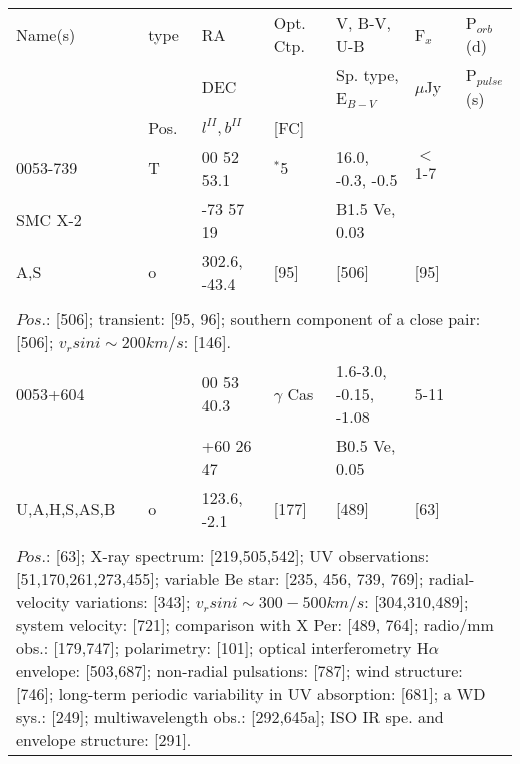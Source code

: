 \documentclass{aa}
\begin{document}
\clearpage\begin{table*}[h]
\begin{tabular}{p{2.5cm}p{1cm}p{1.8cm}p{2.3cm}p{3.3cm}p{2.0cm}p{2.2cm}}
\noalign{\smallskip}
\multicolumn{7}{p{17.5cm}}{Table 1.  (continued) }\\        
\hline
\noalign{\smallskip}
Name(s)      & type  & RA                       &  Opt. Ctp. & V, B-V, U-B                    &   F$_{x}$           & P$_{orb}$(d)    \\
                      &            &  DEC                   &                     &  Sp. type, E$_{B-V}$  &    $\mu$Jy        & P$_{pulse}$(s) \\
                      & Pos.  &  $l^{II}, b^{II}$     &  [FC]           &                                          &                            &                             \\
\noalign{\smallskip} 

\hline
\noalign{\smallskip}
0053-739     &   T      & 00 52 53.1           & $^*$5         & 16.0, -0.3, -0.5                 &    $<$ 1-7          &                              \\
SMC X-2     &            & -73 57 19             &                    & B1.5 Ve, 0.03                  &                            &                              \\
A,S               &  o       & 302.6, -43.4         &  [95]         &    [506]                              &        [95]          &                              \\
\\
\multicolumn{7}{p{17.5cm}}{
$Pos$.: [506]; transient: [95, 96]; southern component of a close pair: [506]; $v_rsin i \sim  200 km/s$: [146].}\\

\noalign{\smallskip}
\hline
\noalign{\smallskip}
0053+604     &            & 00 53 40.3            & $\gamma$ Cas   & 1.6-3.0, -0.15, -1.08   &    5-11        &                   \\
                       &            & +60 26 47             &                                 & B0.5 Ve, 0.05             &                    &                   \\
U,A,H,S,AS,B  &  o       & 123.6, -2.1             &  [177]                      &    [489]                         &   [63]          &                   \\
\\
\multicolumn{7}{p{17.5cm}}{
$Pos$.: [63]; X-ray spectrum: [219,505,542]; UV observations: [51,170,261,273,455]; variable Be star: [235, 456, 739, 769]; 
radial-velocity variations: [343]; $v_rsin i \sim  300-500 km/s$: [304,310,489]; system velocity: [721]; comparison with X Per: 
[489, 764]; radio/mm obs.: [179,747]; polarimetry: [101]; optical interferometry H$\alpha$ envelope: [503,687]; non-radial 
pulsations: [787];  wind structure: [746]; long-term periodic variability in UV absorption: [681]; a WD sys.: [249];
multiwavelength obs.: [292,645a]; ISO IR spe. and envelope structure: [291].}\\


\end{tabular}
\end{table*}
\end{document}
